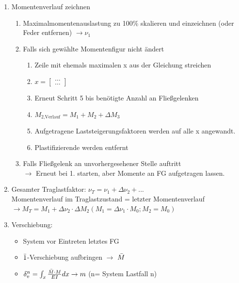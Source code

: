 \documentclass[fleqn,twoside]{article}
\begin{document}
\begin{enumerate}
            \item Momentenverlauf zeichnen
                \begin{enumerate}
                    \item Maximalmomentenauslastung zu 100\% skalieren und einzeichnen (oder Feder entfernen) $\rightarrow \nu_1$
                    \item Falls sich gewählte Momentenfigur nicht ändert 
                        \begin{enumerate}
                            \item Zeile mit ehemals maximalen x aus der Gleichung streichen
                            \item $ x= \begin{bmatrix} \ldots \\ \ldots \end{bmatrix}$
                            \item Erneut Schritt 5 bis benötigte Anzahl an Fließgelenken
                            \item $M_{\text{2,Verlauf}} = M_1 + M_2 + \Delta M_3$
                            \item Aufgetragene Laststeigerungsfaktoren werden auf alle x angewandt. 
                            \item Plastifizierende werden entfernt
                        \end{enumerate}
                    \item Falls Fließgelenk an unvorhergesehener Stelle auftritt \\ $\rightarrow$ Erneut bei 1. starten, aber Momente an FG aufgetragen lassen.
                \end{enumerate}
            \item Gesamter Traglastfaktor: $\nu_T = \nu_1 + \Delta \nu_2 + ...$ \\
                Momentenverlauf im Traglastzustand = letzter Momentenverlauf \\
                $\rightarrow M_T = M_1 + \Delta \nu_2 \cdot \Delta M_2 (M_1 = \Delta \nu_1 \cdot M_0 ; M_2 = M_0)$
            \item Verschiebung:
                \begin{itemize}
                    \item System vor Eintreten letztes FG
                    \item $\Bar{1}$-Verschiebung aufbringen $\rightarrow$ $\Bar{M}$
                    \item $\delta_v^n = \int_x \frac{\Bar{M} \cdot M}{EI} dx \rightarrow m$ (n= System Lastfall n)
                \end{itemize}
        \end{enumerate}
\end{document}
